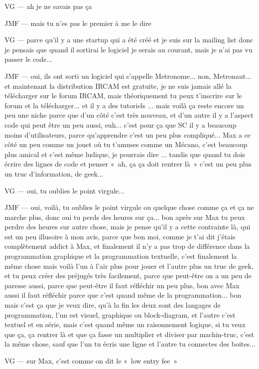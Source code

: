 VG — ah je ne savais pas ça 

JMF — mais tu n'es pas le premier à me le dire  

VG — parce qu'il y a une startup qui a été créé et je suis sur la mailing list donc je pensais que quand il sortirai le logiciel je serais au courant, mais je n'ai pas vu passer le code... 

JMF — oui, ils ont sorti un logiciel qui s'appelle Metronome... non, Metronaut... et maintenant la distribution IRCAM est gratuite, je ne suis jamais allé la télécharger sur le forum IRCAM, mais théoriquement tu peux t'inscrire sur le forum et la télécharger... et il y a des tutoriels ... mais voilà ça reste encore un peu une niche parce que d'un côté c'est très nouveau, et d'un autre il y a l'aspect code qui peut être un peu aussi, euh... c'est pour ça que SC il y a beaucoup moins d'utilisateurs, parce qu'apprendre c'est un peu plus compliqué... Max a ce côté un peu comme un jouet où tu t'amuses comme un Mécano, c'est beaucoup plus amical et c'est même ludique, je pourrais dire ... tandis que quand tu dois écrire des lignes de code et penser « ah, ça ça doit rentrer là » c'est un peu plus un truc d'information, de geek... 

VG — oui, tu oublies le point virgule... 

JMF — oui, voilà, tu oublies le point virgule ou quelque chose comme ça et ça ne marche plus, donc oui tu perds des heures sur ça... bon après sur Max tu peux perdre des heures sur autre chose, mais je pense qu'il y a cette contrainte là, qui est un peu illusoire à mon avis, parce que bon moi, comme je t'ai dit j'étais complètement addict à Max, et finalement il n'y a pas trop de différence dans la programmation graphique et la programmation textuelle, c'est finalement la même chose mais voilà l'un à l'air plus pour jouer et l'autre plus un truc de geek, et tu peux créer des préjugés très facilement, parce que peut-être on a un peu de paresse aussi, parce que peut-être il faut réfléchir un peu plus, bon avec Max aussi il faut réfléchir parce que c'est quand même de la programmation... bon mais c'est ça que je veux dire, qu'à la fin les deux sont des langages de programmation, l'un est visuel, graphique ou block-diagram, et l'autre c'est textuel et en série, mais c'est quand même un raisonnement logique, si tu veux que ça, ça rentrer là et que ça fasse un multiplier et diviser par machin-truc, c'est la même chose, sauf que l'un tu écris une ligne et l'autre tu connectes des boites...  

VG — sur Max, c'est comme on dit le « low entry fee »  

